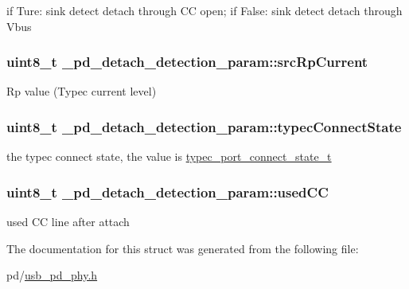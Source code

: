 if Ture\-: sink detect detach through C\-C open; if False\-: sink detect detach through Vbus \hypertarget{struct__pd__detach__detection__param_a9ba36d0a45cb600d503944f7edd5db7d}{
\subsubsection[{src\-Rp\-Current}]{\setlength{\rightskip}{0pt plus 5cm}uint8\-\_\-t \-\_\-pd\-\_\-detach\-\_\-detection\-\_\-param\-::src\-Rp\-Current}}\label{struct__pd__detach__detection__param_a9ba36d0a45cb600d503944f7edd5db7d}
Rp value (Typec current level) \hypertarget{struct__pd__detach__detection__param_a3972d78d7c87afef1c5d732aca07cacc}{
\subsubsection[{typec\-Connect\-State}]{\setlength{\rightskip}{0pt plus 5cm}uint8\-\_\-t \-\_\-pd\-\_\-detach\-\_\-detection\-\_\-param\-::typec\-Connect\-State}}\label{struct__pd__detach__detection__param_a3972d78d7c87afef1c5d732aca07cacc}
the typec connect state, the value is \hyperlink{group__usb__pd__stack_ga416d720fe603166cb1c16443199d42f8}{typec\-\_\-port\-\_\-connect\-\_\-state\-\_\-t} \hypertarget{struct__pd__detach__detection__param_ac0e0e85417ccfdbec7069854ca6a24d6}{
\subsubsection[{used\-C\-C}]{\setlength{\rightskip}{0pt plus 5cm}uint8\-\_\-t \-\_\-pd\-\_\-detach\-\_\-detection\-\_\-param\-::used\-C\-C}}\label{struct__pd__detach__detection__param_ac0e0e85417ccfdbec7069854ca6a24d6}
used C\-C line after attach 

The documentation for this struct was generated from the following file\-:\begin{DoxyCompactItemize}
\item 
pd/\hyperlink{usb__pd__phy_8h}{usb\-\_\-pd\-\_\-phy.\-h}\end{DoxyCompactItemize}
